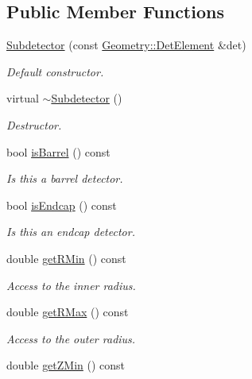 \subsection*{Public Member Functions}
\begin{DoxyCompactItemize}
\item 
\hyperlink{class_d_d4hep_1_1_d_d_rec_1_1_subdetector_a2583b3d4d1bb2a6bcf8bb711e840bb05}{Subdetector} (const \hyperlink{class_d_d4hep_1_1_geometry_1_1_det_element}{Geometry\+::\+Det\+Element} \&det)
\begin{DoxyCompactList}\small\item\em Default constructor. \end{DoxyCompactList}\item 
virtual \hyperlink{class_d_d4hep_1_1_d_d_rec_1_1_subdetector_afae5c6780ba1bd9a99b49e9ee6618ee8}{$\sim$\+Subdetector} ()
\begin{DoxyCompactList}\small\item\em Destructor. \end{DoxyCompactList}\item 
bool \hyperlink{class_d_d4hep_1_1_d_d_rec_1_1_subdetector_a25c6a34b2548340115138840790b9d57}{is\+Barrel} () const
\begin{DoxyCompactList}\small\item\em Is this a barrel detector. \end{DoxyCompactList}\item 
bool \hyperlink{class_d_d4hep_1_1_d_d_rec_1_1_subdetector_a299bd4777e3110838df51be7c0809b35}{is\+Endcap} () const
\begin{DoxyCompactList}\small\item\em Is this an endcap detector. \end{DoxyCompactList}\item 
double \hyperlink{class_d_d4hep_1_1_d_d_rec_1_1_subdetector_ae68b5a1b360a953b02ada83d0dedb526}{get\+R\+Min} () const
\begin{DoxyCompactList}\small\item\em Access to the inner radius. \end{DoxyCompactList}\item 
double \hyperlink{class_d_d4hep_1_1_d_d_rec_1_1_subdetector_a3b735c48952a9a3a93abf0e38f3fd2d2}{get\+R\+Max} () const
\begin{DoxyCompactList}\small\item\em Access to the outer radius. \end{DoxyCompactList}\item 
double \hyperlink{class_d_d4hep_1_1_d_d_rec_1_1_subdetector_ac40859c553f3f1389b43376eb27173d9}{get\+Z\+Min} () const

\end{DoxyCompactItemize}
